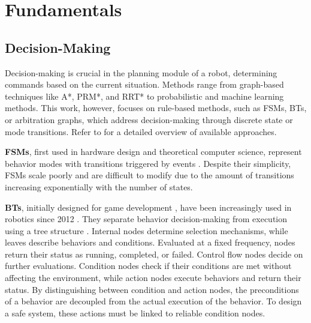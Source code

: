
\section{Fundamentals}

\subsection{Decision-Making}

Decision-making is crucial in the planning module of a robot, determining commands based on the current situation.
Methods range from graph-based techniques like A*, PRM*, and RRT* to probabilistic and machine learning methods.
This work, however, focuses on rule-based methods, such as \glspl{FSM}, \glspl{BT}, or arbitration graphs, which address decision-making through discrete state or mode transitions.
Refer to \cite{schwartingPlanningDecisionMakingAutonomous2018,yurtseverSurveyAutonomousDriving2020,gammellAsymptoticallyOptimalSamplingBased2021}
for a detailed overview of available approaches.

\textbf{\glspl{FSM}}, first used in hardware design and theoretical computer science,
represent behavior modes with transitions triggered by events \cite{wagnerModelingSoftwareFinite2006,hopcroftIntroductionAutomataTheory2007}.
Despite their simplicity, \glspl{FSM} scale poorly and are difficult to modify due to the amount of transitions increasing exponentially with the number of states.

\textbf{\glspl{BT}}, initially designed for game development \cite{iovinoProgrammingEffortRequired2022},
have been increasingly used in robotics since 2012 \cite{bagnellIntegratedSystemAutonomous2012,ogrenIncreasingModularityUAV2012}.
They separate behavior decision-making from execution using a tree structure \cite{colledanchiseBehaviorTreesRobotics2018}.
Internal nodes determine selection mechanisms, while leaves describe behaviors and conditions.
Evaluated at a fixed frequency, nodes return their status as running, completed, or failed.
Control flow nodes decide on further evaluations.
%
Condition nodes check if their conditions are met without affecting the environment, while action nodes execute behaviors and return their status.
By distinguishing between condition and action nodes, the preconditions of a behavior  are decoupled from the actual execution of the behavior.
To design a safe system, these actions must be linked to reliable condition nodes.

